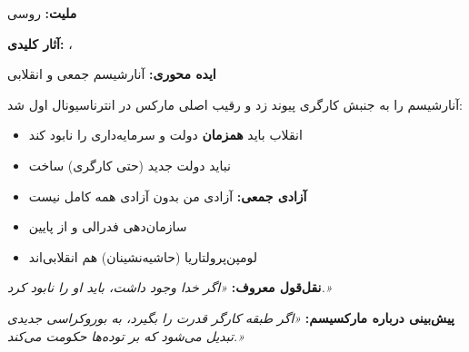 \begin{personbox}

\textbf{ملیت:} روسی

\textbf{آثار کلیدی:} ، 

\textbf{ایده محوری:} آنارشیسم جمعی و انقلابی

\mediumspace

 آنارشیسم را به جنبش کارگری پیوند زد و رقیب اصلی مارکس در انترناسیونال اول شد:

\begin{itemize}[nosep]
    \item انقلاب باید \textbf{همزمان} دولت و سرمایه‌داری را نابود کند
    \item نباید دولت جدید (حتی کارگری) ساخت
    \item \textbf{آزادی جمعی:} آزادی من بدون آزادی همه کامل نیست
    \item سازمان‌دهی فدرالی و از پایین
    \item لومپن‌پرولتاریا (حاشیه‌نشینان) هم انقلابی‌اند
\end{itemize}

\mediumspace

\textbf{نقل‌قول معروف:} \textit{«اگر خدا وجود داشت، باید او را نابود کرد.»}

\textbf{پیش‌بینی درباره مارکسیسم:} \textit{«اگر طبقه کارگر قدرت را بگیرد، به بوروکراسی جدیدی تبدیل می‌شود که بر توده‌ها حکومت می‌کند.»}
\end{personbox}

